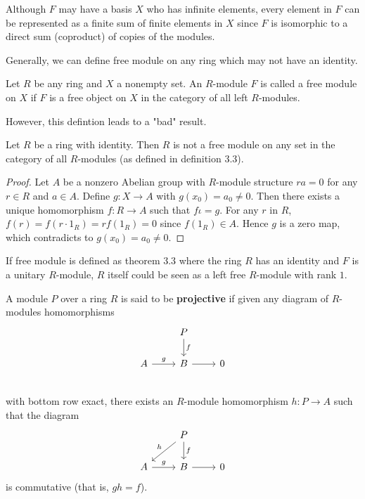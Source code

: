\documentclass{article}
\begin{document}
Although $F$ may have a basis $X$ who has infinite elements, every element in $F$ can be represented as a finite sum of finite elements in $X$ since $F$ is isomorphic to a direct sum (coproduct) of copies of the modules.

Generally, we can define free module on any ring which may not have an identity. 
\begin{definition}
    Let $R$ be any ring and $X$ a nonempty set. An $R$-module $F$ is called a free module on $X$ if $F$ is a free object on $X$ in the category of all left $R$-modules.
\end{definition}

However, this defintion leads to a "bad" result.
\begin{example}
    Let $R$ be a ring with identity. Then $R$ is not a free module on any set in the category of all $R$-modules (as defined in definition 3.3).
\end{example}
\begin{proof}
    Let $A$ be a nonzero Abelian group with $R$-module structure $ra=0$ for any $r \in R$ and $a \in A$. Define $g:X\to A$ with $g(x_{0})=a_{0}\neq 0$. Then there exists a unique homomorphism $f:R\to A$ such that $f\iota=g$. For any $r$ in $R$, $f(r)=f(r\cdot 1_R)=rf(1_R)=0$ since $f(1_R)\in A$. Hence $g$ is a zero map, which contradicts to $g(x_{0})=a_{0}\neq 0$.
\end{proof}
If free module is defined as theorem 3.3 where the ring $R$ has an identity and $F$ is a unitary $R$-module, $R$ itself could be seen as a left free $R$-module with rank $1$.

\begin{definition}
    A module $P$ over a ring $R$ is said to be \textbf{projective} if given any diagram of $R$-modules homomorphisms
    $$\begin{tikzcd}
     & P\arrow[d,"f"] & \\
     A \arrow[r, "g"] & B \arrow[r]& 0\\ 
    \end{tikzcd}$$
    with bottom row exact, there exists an $R$-module homomorphism $h:P\to A$ such that the diagram 
    $$\begin{tikzcd}
                 & P \arrow[d, "f"] \arrow[ld, "h"'] &   \\
A \arrow[r, "g"] & B \arrow[r]                       & 0
\end{tikzcd}$$
is commutative (that is, $gh=f$).
\end{definition}
\end{document}
